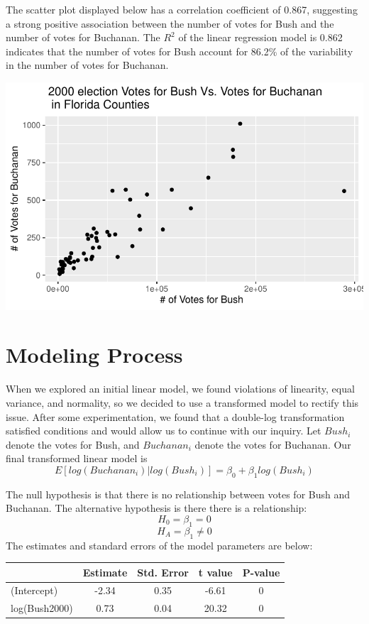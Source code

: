 \documentclass[
  letterpaper,
  DIV=11,
  numbers=noendperiod]{scrartcl}
\begin{document}
The scatter plot displayed below has a correlation coefficient of 0.867,
suggesting a strong positive association between the number of votes for
Bush and the number of votes for Buchanan. The \(R^2\) of the linear
regression model is 0.862 indicates that the number of votes for Bush
account for 86.2\% of the variability in the number of votes for
Buchanan.

\includegraphics{case-study-template_files/figure-pdf/unnamed-chunk-4-1.pdf}

\section{Modeling Process}\label{modeling-process}

When we explored an initial linear model, we found violations of
linearity, equal variance, and normality, so we decided to use a
transformed model to rectify this issue. After some experimentation, we
found that a double-log transformation satisfied conditions and would
allow us to continue with our inquiry. Let \(Bush_i\) denote the votes
for Bush, and \(Buchanan_i\) denote the votes for Buchanan. Our final
transformed linear model is
\[E[log(Buchanan_i)|log(Bush_i)] = \beta_0 + \beta_1log(Bush_i)\]

The null hypothesis is that there is no relationship between votes for
Bush and Buchanan. The alternative hypothesis is there there is a
relationship: \[H_0 = \beta_1 = 0\] \[H_A = \beta_1 \neq 0\] The
estimates and standard errors of the model parameters are below:

\begin{table}[H]
\centering
\begin{tabular}[t]{lcccc}
\toprule
  & Estimate & Std. Error & t value & P-value\\
\midrule
(Intercept) & -2.34 & 0.35 & -6.61 & 0\\
log(Bush2000) & 0.73 & 0.04 & 20.32 & 0\\
\bottomrule
\end{tabular}
\end{table}
\end{document}

